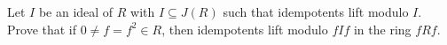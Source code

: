 Let $I$ be an ideal of $R$ with $I \subseteq J(R)$ such that idempotents lift modulo $I$. Prove that if $0 \neq f = f^2 \in R$, then idempotents lift modulo $f I f$ in the ring $f R f$.
